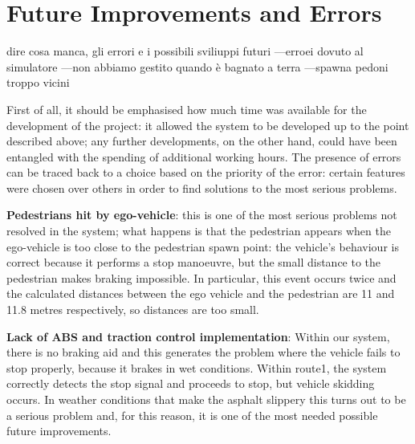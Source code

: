 \documentclass{article}
\begin{document}
\section{Future Improvements and Errors}
dire cosa manca, gli errori e i possibili sviliuppi futuri
---erroei dovuto al simulatore
---non abbiamo gestito quando è bagnato a terra
---spawna pedoni troppo vicini



First of all, it should be emphasised how much time was available for the development of the project: it allowed the system to 
be developed up to the point described above; any further developments, on the other hand, could have been entangled with the 
spending of additional working hours. 
The presence of errors can be traced back to a choice based on the priority of the error: certain features were chosen over 
others in order to find solutions to the most serious problems.

\textbf{Pedestrians hit by ego-vehicle}: this is one of the most serious problems not resolved in the system; what 
    happens is that the pedestrian appears when the ego-vehicle is too close to the pedestrian spawn point: the vehicle's behaviour 
    is correct because it performs a stop manoeuvre, but the small distance to the pedestrian makes braking impossible. 
    In particular, this event occurs twice and the calculated distances between the ego vehicle and the pedestrian are 11 and 
    11.8 metres respectively, so distances are too small.

\textbf{Lack of ABS and traction control implementation}: Within our system, there is no braking aid and this generates the 
problem where the vehicle fails to stop properly, because it brakes in wet conditions. 
Within route1, the system correctly detects the stop signal and proceeds to stop, but vehicle skidding occurs.
In weather conditions that make the asphalt slippery this turns out to be a serious problem and, for this reason, it is one 
of the most needed possible future improvements.
\end{document}
